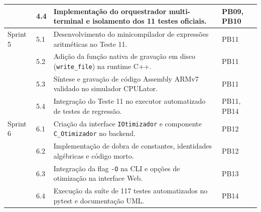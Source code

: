 \begin{table}[htbp]
\begin{tabular}{p{1.8cm}p{1.0cm}p{9.4cm}p{1.8cm}}
         & 4.4 & Implementação do orquestrador multi-terminal e isolamento dos 11 testes oficiais. & PB09, PB10 \\
\midrule
Sprint 5 & 5.1 & Desenvolvimento do minicompilador de expressões aritméticas no Teste 11. & PB11 \\
         & 5.2 & Adição da função nativa de gravação em disco (\texttt{write\_file}) na runtime C++. & PB11 \\
         & 5.3 & Síntese e gravação de código Assembly ARMv7 validado no simulador CPULator. & PB11 \\
         & 5.4 & Integração do Teste 11 no executor automatizado de testes de regressão. & PB11, PB14 \\
\midrule
Sprint 6 & 6.1 & Criação da interface \texttt{IOtimizador} e componente \texttt{C\_Otimizador} no backend. & PB12 \\
         & 6.2 & Implementação de dobra de constantes, identidades algébricas e código morto. & PB12 \\
         & 6.3 & Integração da flag \texttt{-O} na CLI e opções de otimização na interface Web. & PB13 \\
         & 6.4 & Execução da suíte de 117 testes automatizados no pytest e documentação UML. & PB14 \\
\bottomrule
\end{tabular}
\end{table}
